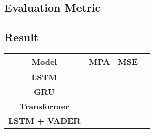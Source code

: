 \subsection{Evaluation Metric}


\subsection{Result}

\begin{table}[h]
	\label{tab:result}

	\centering
	\begin{tabular}{c|rrr}
	\toprule\toprule
	\textbf{Model} & \textbf{MPA} & \textbf{MSE}  \\ 
	\midrule
	\textbf{LSTM} &  &   \\ 
	\textbf{GRU} &  &   \\ 
	\textbf{Transformer} &  &   \\ 
	\textbf{LSTM + VADER} &  &   \\ 
	\bottomrule
	\end{tabular}
\end{table}